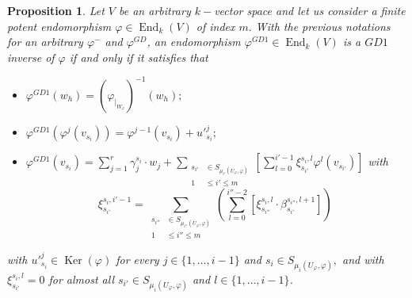 \documentclass[10pt,a4paper]{amsart}
\newtheorem{prop}[defn]{Proposition}
\theoremstyle{plain}
\theoremstyle{remark}
\numberwithin{equation}{section} \numberwithin{defn}{section}
\newcommand\ed{\operatorname{End}}
\newcommand\Ker{\operatorname{Ker}}
\newcommand{\f}{\varphi}
\begin{document}
\begin{prop}\label{P: CharactGD1FP}
Let $V$ be an arbitrary $k-$vector space and let us consider a finite potent endomorphism $\f \in \ed_k(V)$ of index $m.$ With the previous notations for an arbitrary $\f^-$ and $\f^{GD}$, an endomorphism $\f^{GD1}\in \ed_k(V)$ is a $GD1$ inverse of $\f$ if and only if it satisfies that
\begin{itemize}
\item $\f^{GD1}(w_h)=(\f_{\vert_{ W_{\f}}})^{-1}(w_h);$
\item $\f^{GD1}(\f^j(v_{s_i}))=\f^{j-1}(v_{s_i})+u'^j_{s_i};$ 
\item $\f^{GD1}(v_{s_i})= \sum_{j=1}^r \gamma_j^{s_i}\cdot w_j + \underset {\begin{aligned} s_{i'} &\in S_{{\mu}_{i'} (U_\varphi, \varphi)} \\ 1 &\leq i' \leq m \end{aligned}} \sum [\sum_{l=0}^{i'-1} \xi_{s_{i'}}^{s_i,l} \varphi^{l} ({{v_{s_{i'}}}})]$
with
$$\xi_{s_{i'}}^{s_i,i'-1} = \underset {\begin{aligned} s_{i''} &\in S_{{\mu}_{i''} (U_\varphi, \varphi)} \\ 1 &\leq i'' \leq m \end{aligned}} \sum {( \sum_{l=0}^{i''-2} [\xi_{s_{i''}}^{s_i,l} \cdot \beta_{s_{i'}}^{s_{i''},l+1}] )}\, 
$$\noindent 
\end{itemize}with  $u'^j_{s_i}\in \Ker(\f)$ for every  $j\in\{1,\dots,i-1 \}$ and $s_i\in S_{{\mu}_{i}(U_\varphi, \varphi)},$ and with  $\xi_{s_{i'}}^{s_i,l} = 0$ for almost all  $s_{i'} \in S_{{\mu}_i (U_\varphi, \varphi)}$ and $l\in \{1, \dots, i-1\}$.

\end{prop}
\end{document}
